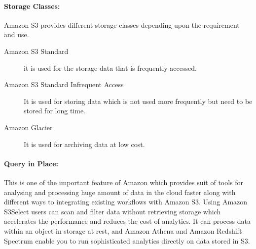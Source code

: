 \paragraph{Storage Classes: }

Amazon S3 provides different storage classes depending upon the requirement and
use.
\begin{description}
\item [Amazon S3 Standard] it is used for the storage data that is frequently accessed.
\item [Amazon S3 Standard Infrequent Access] It is used for storing data which is not
used more frequently but need to be stored for long time.
\item [Amazon Glacier] It is used for archiving data at low cost. 

\end{description}


\paragraph{Query in Place: } 

This is one of the important feature of Amazon which provides suit of tools for
analysing and processing huge amount of data in the cloud faster along with
different ways to integrating existing workflows with Amazon S3. Using Amazon
S3Select users can scan and filter data without retrieving storage which
accelerates the performance and reduces the cost of analytics. It can process
data within an object in storage at rest, and Amazon Athena and Amazon Redshift
Spectrum enable you to run sophisticated analytics directly on data stored in
S3.

